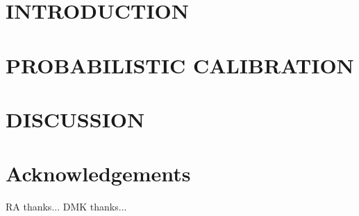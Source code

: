 \documentclass[apjl]{emulateapj}
\begin{document}

\section{INTRODUCTION}
\label{sec:intro}



\section{PROBABILISTIC CALIBRATION}
\label{sec:HBM}



\section{DISCUSSION}
\label{sec:discussion}



\acknowledgements
\section*{Acknowledgements}

RA thanks...
DMK thanks...

\end{document}
